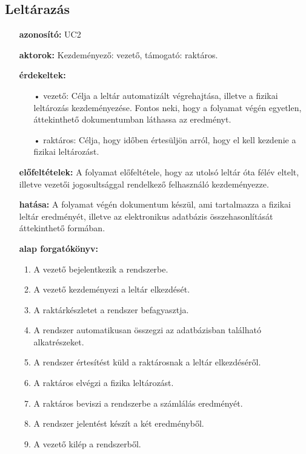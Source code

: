 \documentclass[12pt]{article}\usepackage[left=20mm,right=20mm,top=15mm,bottom=20mm]{geometry}
\begin{document}
\subsection{Leltárazás}
\begin{itemize}
\item[] \textbf{azonosító: } UC2
\item[] \textbf{aktorok: } Kezdeményező: vezető, támogató: raktáros.

\item[] \textbf{érdekeltek: }
\vspace*{-3mm}
\begin{itemize}
\item[•] vezető: Célja a leltár automatizált végrehajtása, illetve a fizikai leltározás kezdeményezése. Fontos neki, hogy a folyamat végén egyetlen, áttekinthető dokumentumban láthassa az eredményt.

\item[•] raktáros: Célja, hogy időben értesüljön arról, hogy el kell kezdenie a fizikai leltározást. 
\end{itemize}

\item[] \textbf{előfeltételek: } A folyamat előfeltétele, hogy az utolsó leltár óta félév eltelt, illetve vezetői jogosultsággal rendelkező felhasználó kezdeményezze.

\item[] \textbf{hatása: }
A folyamat végén dokumentum készül, ami tartalmazza a fizikai leltár eredményét, illetve az elektronikus adatbázis összehasonlítását áttekinthető formában.

\item[] \textbf{alap forgatókönyv: }
\begin{enumerate}
\item A vezető bejelentkezik a rendszerbe.
\item A vezető kezdeményezi a leltár elkezdését.
\item A raktárkészletet a rendszer befagyasztja.
\item A rendszer automatikusan összegzi az adatbázisban található alkatrészeket.
\item A rendszer értesítést küld a raktárosnak a leltár elkezdéséről.
\item A raktáros elvégzi a fizika leltározást.
\item A raktáros beviszi a rendszerbe a számlálás eredményét.
\item A rendszer jelentést készít a két eredményből.
\item A vezető kilép a rendszerből.
\end{enumerate}
\end{itemize} 
\end{document}
